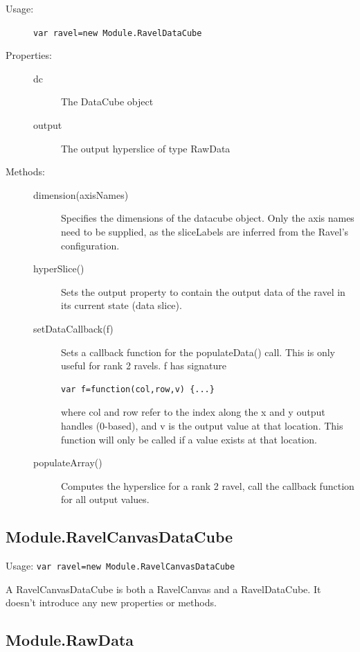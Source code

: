 \documentclass{article}
\begin{document}
\begin{description}
\item[Usage:] \verb+var ravel=new Module.RavelDataCube+
  
\item[Properties:]\mbox{}
  \begin{description}
  \item[dc] The DataCube object
  \item[output] The output hyperslice of type RawData
  \end{description}
  
\item[Methods:]\mbox{}
  \begin{description}
  \item[dimension(axisNames)]  Specifies the dimensions of the datacube
    object. Only the axis names need to be supplied, as the sliceLabels
    are inferred from the Ravel's configuration.
  \item[hyperSlice()] Sets the output property to contain the output
    data of the ravel in its current state (data slice). 
  \item[setDataCallback(f)] Sets a callback function for the
    populateData() call. This is only useful for rank 2 ravels. f has
    signature
\begin{verbatim}
var f=function(col,row,v) {...}
\end{verbatim}
where col and row refer to the index along the x and y output handles
(0-based), and v is the output value at that location. This function
will only be called if a value exists at that location.
\item[populateArray()] Computes the hyperslice for a rank 2 ravel,
call the callback function for all output values.

  \end{description}
\end{description}

\subsection{Module.RavelCanvasDataCube}

Usage: \verb+var ravel=new Module.RavelCanvasDataCube+

A RavelCanvasDataCube is both a RavelCanvas and a RavelDataCube. It
doesn't introduce any new properties or methods.

\subsection{Module.RawData}
\end{document}
